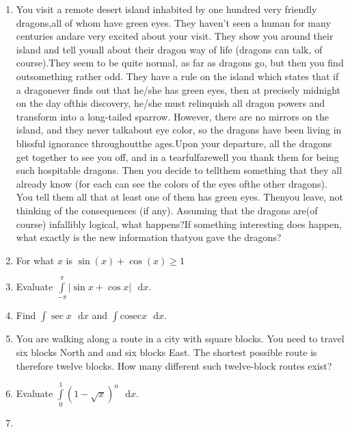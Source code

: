 \documentclass{article}
\begin{document}
\begin{enumerate}
    \item
    You visit a remote desert island inhabited by one hundred very friendly dragons,all of whom have green eyes. They haven’t seen a human for many centuries andare very excited about your visit. They show you around their island and tell youall about their dragon way of life (dragons can talk, of course).They seem to be quite normal, as far as dragons go, but then you find outsomething rather odd. They have a rule on the island which states that if a dragonever finds out that he/she has green eyes, then at precisely midnight on the day ofthis discovery, he/she must relinquish all dragon powers and transform into a long-tailed sparrow. However, there are no mirrors on the island, and they never talkabout eye color, so the dragons have been living in blissful ignorance throughoutthe ages.Upon your departure, all the dragons get together to see you off, and in a tearfulfarewell you thank them for being such hospitable dragons. Then you decide to tellthem something that they all already know (for each can see the colors of the eyes ofthe other dragons). You tell them all that at least one of them has green eyes. Thenyou leave, not thinking of the consequences (if any). Assuming that the dragons are(of course) infallibly logical, what happens?If something interesting does happen, what exactly is the new information thatyou gave the dragons? %

    \item
    For what $x$ is $\sin(x) + \cos(x) \geq 1$
    
    
    \item
    Evaluate $\int \limits_{-\pi}^{\pi} |\sin x + \cos x|\text{ }\mathrm{d}x$.
    
    \item
    Find $\int \sec x \text{ }\mathrm{d}x$ and $\int \mathrm{cosec} x \text{ }\mathrm{d}x$.
    
    \item
    You are walking along a route in a city with square blocks. You need to travel six blocks North and and six blocks East. The shortest possible route is therefore twelve blocks. How many different such twelve-block routes exist?
    
    \item
    Evaluate $\int \limits_{0}^{1} (1-\sqrt{x})^n \text{ }\mathrm{d}x$.
    
    \item
    

\end{enumerate}
\end{document}
